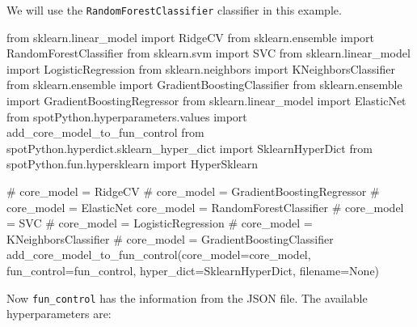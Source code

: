 \documentclass[
  letterpaper,
  DIV=11,
  numbers=noendperiod]{scrreprt}
\newenvironment{Shaded}{\begin{snugshade}}{\end{snugshade}}
\newcommand{\CommentTok}[1]{\textcolor[rgb]{0.37,0.37,0.37}{#1}}
\newcommand{\ImportTok}[1]{\textcolor[rgb]{0.00,0.46,0.62}{#1}}
\newcommand{\NormalTok}[1]{\textcolor[rgb]{0.00,0.23,0.31}{#1}}
\newcommand{\OperatorTok}[1]{\textcolor[rgb]{0.37,0.37,0.37}{#1}}
\newcommand{\VariableTok}[1]{\textcolor[rgb]{0.07,0.07,0.07}{#1}}
\begin{document}
We will use the \texttt{RandomForestClassifier} classifier in this
example.

\begin{Shaded}
\begin{Highlighting}[]
\ImportTok{from}\NormalTok{ sklearn.linear\_model }\ImportTok{import}\NormalTok{ RidgeCV}
\ImportTok{from}\NormalTok{ sklearn.ensemble }\ImportTok{import}\NormalTok{ RandomForestClassifier}
\ImportTok{from}\NormalTok{ sklearn.svm }\ImportTok{import}\NormalTok{ SVC}
\ImportTok{from}\NormalTok{ sklearn.linear\_model }\ImportTok{import}\NormalTok{ LogisticRegression}
\ImportTok{from}\NormalTok{ sklearn.neighbors }\ImportTok{import}\NormalTok{ KNeighborsClassifier}
\ImportTok{from}\NormalTok{ sklearn.ensemble }\ImportTok{import}\NormalTok{ GradientBoostingClassifier}
\ImportTok{from}\NormalTok{ sklearn.ensemble }\ImportTok{import}\NormalTok{ GradientBoostingRegressor}
\ImportTok{from}\NormalTok{ sklearn.linear\_model }\ImportTok{import}\NormalTok{ ElasticNet}
\ImportTok{from}\NormalTok{ spotPython.hyperparameters.values }\ImportTok{import}\NormalTok{ add\_core\_model\_to\_fun\_control}
\ImportTok{from}\NormalTok{ spotPython.hyperdict.sklearn\_hyper\_dict }\ImportTok{import}\NormalTok{ SklearnHyperDict}
\ImportTok{from}\NormalTok{ spotPython.fun.hypersklearn }\ImportTok{import}\NormalTok{ HyperSklearn}
\end{Highlighting}
\end{Shaded}

\begin{Shaded}
\begin{Highlighting}[]
\CommentTok{\# core\_model  = RidgeCV}
\CommentTok{\# core\_model = GradientBoostingRegressor}
\CommentTok{\# core\_model = ElasticNet}
\NormalTok{core\_model }\OperatorTok{=}\NormalTok{ RandomForestClassifier}
\CommentTok{\# core\_model = SVC}
\CommentTok{\# core\_model = LogisticRegression}
\CommentTok{\# core\_model = KNeighborsClassifier}
\CommentTok{\# core\_model = GradientBoostingClassifier}
\NormalTok{add\_core\_model\_to\_fun\_control(core\_model}\OperatorTok{=}\NormalTok{core\_model,}
\NormalTok{                              fun\_control}\OperatorTok{=}\NormalTok{fun\_control,}
\NormalTok{                              hyper\_dict}\OperatorTok{=}\NormalTok{SklearnHyperDict,}
\NormalTok{                              filename}\OperatorTok{=}\VariableTok{None}\NormalTok{)}
\end{Highlighting}
\end{Shaded}

Now \texttt{fun\_control} has the information from the JSON file. The
available hyperparameters are:
\end{document}
